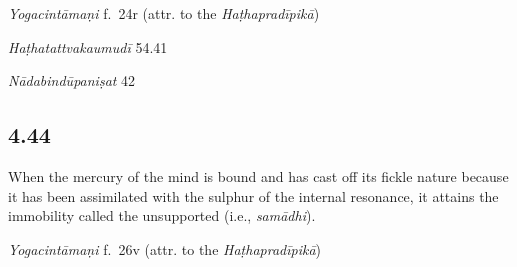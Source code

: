 \begin{ekdosis}
\begin{testimonia}[hp04_043]
\emph{Yogacintāmaṇi} f.~24r (attr. to the \emph{Haṭhapradīpikā})
\begin{versinnote}
\end{versinnote}

\emph{Haṭhatattvakaumudī} 54.41
\begin{versinnote}
\end{versinnote}

\emph{Nādabindūpaniṣat} 42
\begin{versinnote}
\end{versinnote}
\end{testimonia}


\subsection*{4.44}
\begin{translation}[hp04_044]
When the mercury of the mind is bound and has cast off its fickle nature because it has been assimilated with the sulphur of the internal resonance, it attains the immobility called the unsupported (i.e., \textit{samādhi}).
\end{translation}


\begin{testimonia}[hp04_044]
\emph{Yogacintāmaṇi} f.~26v (attr. to the \emph{Haṭhapradīpikā})
\begin{versinnote}
\end{versinnote}


\end{testimonia}
\end{ekdosis}
